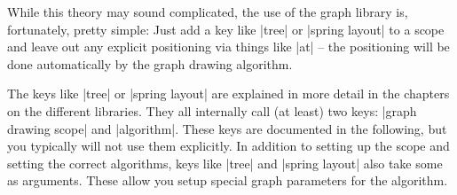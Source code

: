 While this theory may sound complicated, the use of the graph library
is, fortunately, pretty simple: Just add a key like |tree| or
|spring layout| to a scope and leave out any explicit positioning via
things like |at| -- the positioning will be done automatically by the
graph drawing algorithm.

The keys like |tree| or |spring layout| are explained in more detail
in the chapters on the different libraries. They all internally call
(at least) two keys: |graph drawing scope| and |algorithm|. These
keys are documented in the following, but you typically will not use
them explicitly. In addition to setting up the scope and setting the
correct algorithms, keys like |tree| and |spring layout| also take
some  as arguments. These  allow you setup
special graph parameters for the algorithm.

